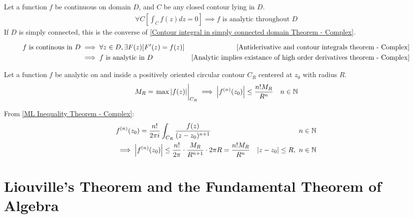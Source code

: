 \documentclass[12pt, english]{book}
\makeatletter
\renewenvironment{proof}[1][\proofname]{\par
	\pushQED{\qed}%
	\normalfont \topsep6\p@\@plus6\p@\relax
	\list{}{%
		\settowidth{\leftmargin}{\itshape\proofname:\hskip\labelsep}%
		\setlength{\labelwidth}{0pt}%
		\setlength{\itemindent}{-\leftmargin}%
	}%
	\item[\hskip\labelsep\itshape#1\@addpunct{:}]\ignorespaces
	}{ \popQED\endlist\@endpefalse}
\makeatother
\begin{document}
	\begin{theorem}
		\label{Continuity on closed contour implies and zero contour integral implies analycity Theorem - Complex}
		Let a function \(f\) be continuous on domain \(D\), and \(C\) be any closed contour lying in \(D\).
		\begin{align*}
			\forall C \left[\int_{C} f(z) dz = 0 \right]
			\implies f \text{ is analytic throughout } D
		\end{align*}
		If \(D\) is simply connected, this is the converse of \cref{Contour integral in simply connected domain Theorem - Complex}.
	\end{theorem}
	\begin{proof}
		\begin{align*}
			f \text{ is continous in } D
			&\implies \forall z \in D, \exists F(z) [F'(z) = f(z)] 
				& \Cref{Antiderivative and contour integrals theorem - Complex}\\
			&\implies f \text{ is analytic in }  D
				& \Cref{Analytic implies existance of high order derivatives theorem - Complex}
		\end{align*}
	\end{proof}

	\begin{theorem}
		\label{Cauchy's Inequality Theorem - Complex}
		Let a function \(f\) be analytic on and inside a positively oriented circular contour \(C_R\) centered at \(z_0\) with radius \(R\). 
		\begin{align*}
			M_R = \eval{\max\abs{f(z)}}_{C_R} &\implies \abs{f^{(n)}(z_0)} \leq \frac{n! M_R}{R^n}
				& n \in \mathbb{N}
		\end{align*}
	\end{theorem}
	\begin{proof}
		From \cref{ML Inequality Theorem - Complex}:
		\begin{align*}
			&f^{(n)}(z_0) = \frac{n!}{2\pi i} \int_{C_R} \frac{f(z)}{(z-z_0)^{n+1}} & n \in \mathbb{N}\\
			&\implies \abs{f^{(n)}(z_0)} \leq \frac{n!}{2\pi} \cdot \frac{M_R}{R^{n+1}} \cdot 2 \pi R = \frac{n! M_R}{R^n} & \abs{z-z_0}\leq R, \  n \in \mathbb{N}
		\end{align*}
	\end{proof}
	
	\section{Liouville's Theorem and the Fundamental Theorem of Algebra} \label{Liouville's Theorem and the Fundamental Theorem of Algebra Section - Complex}
	
\end{document}
